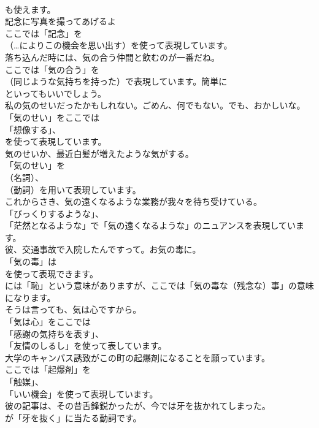 \documentclass[8pt]{extreport}
\begin{document}
\begin{CJK}{UTF8}{min}
\\	も使えます。	
\\	記念に写真を撮ってあげるよ 
\\	ここでは「記念」を 
\\	（…によりこの機会を思い出す）を使って表現しています。	
\\	落ち込んだ時には、気の合う仲間と飲むのが一番だね。 
\\	ここでは「気の合う」を 
\\	（同じような気持ちを持った）で表現しています。簡単に 
\\	といってもいいでしょう。	
\\	私の気のせいだったかもしれない。ごめん、何でもない。でも、おかしいな。 
\\	「気のせい」をここでは
\\	「想像する」、
\\	を使って表現しています。	
\\	気のせいか、最近白髪が増えたような気がする。 
\\	「気のせい」を
\\	（名詞）、
\\	（動詞）を用いて表現しています。	
\\	これからさき、気の遠くなるような業務が我々を待ち受けている。 
\\	「びっくりするような」、
\\	「茫然となるような」で「気の遠くなるような」のニュアンスを表現しています。	
\\	彼、交通事故で入院したんですって。お気の毒に。 
\\	「気の毒」は
\\	を使って表現できます。
\\	には「恥」という意味がありますが、ここでは「気の毒な（残念な）事」の意味になります。	
\\	そうは言っても、気は心ですから。 
\\	「気は心」をここでは
\\	「感謝の気持ちを表す」、 
\\	「友情のしるし」を使って表しています。	
\\	大学のキャンパス誘致がこの町の起爆剤になることを願っています。 
\\	ここでは「起爆剤」を
\\	「触媒」、
\\	「いい機会」を使って表現しています。	
\\	彼の記事は、その昔舌鋒鋭かったが、今では牙を抜かれてしまった。 
\\	が「牙を抜く」に当たる動詞です。

\end{CJK}
\end{document}
